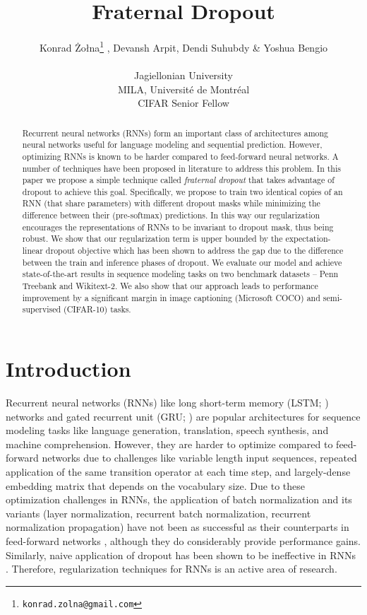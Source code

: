 \documentclass{article} \usepackage{iclr2018_conference,times}
\title{Fraternal Dropout}
\author{
Konrad \.Zo\l{}na\thanks{\texttt{konrad.zolna@gmail.com}}  , Devansh Arpit, Dendi Suhubdy \& Yoshua Bengio
\\\\
Jagiellonian University\\
MILA, Universit\'e de Montr\'eal\\
CIFAR Senior Fellow}
\begin{document}
\maketitle

\begin{abstract}
Recurrent neural networks (RNNs) form an important class of architectures among neural networks useful for language modeling and sequential prediction. However, optimizing RNNs is known to be harder compared to feed-forward neural networks. A number of techniques have been proposed in literature to address this problem. In this paper we propose a simple technique called \emph{fraternal dropout} that takes advantage of dropout to achieve this goal. Specifically, we propose to train two identical copies of an RNN (that share parameters) with different dropout masks while minimizing the difference between their (pre-softmax) predictions. In this way our regularization encourages the representations of RNNs to be invariant to dropout mask, thus being robust. We show that our regularization term is upper bounded by the expectation-linear dropout objective which has been shown to address the gap due to the difference between the train and inference phases of dropout. We evaluate our model and achieve state-of-the-art results in sequence modeling tasks on two benchmark datasets -- Penn Treebank and Wikitext-2. We also show that our approach leads to performance improvement by a significant margin in image captioning (Microsoft COCO) and semi-supervised (CIFAR-10) tasks.
\end{abstract}

\section{Introduction}
Recurrent neural networks (RNNs) like long short-term memory (LSTM; \cite{lstm}) networks and gated recurrent unit (GRU; \cite{gru}) are popular architectures for sequence modeling tasks like language generation, translation, speech synthesis, and machine comprehension. However, they are harder to optimize compared to feed-forward networks due to challenges like variable length input sequences, repeated application of the same transition operator at each time step, and largely-dense embedding matrix that depends on the vocabulary size. Due to these optimization challenges in RNNs, the application of batch normalization and its variants (layer normalization, recurrent batch normalization, recurrent normalization propagation) have not been as successful as their counterparts in feed-forward networks \citep{laurent2016batch}, although they do considerably provide performance gains. Similarly, naive application of dropout \citep{srivastava2014dropout} has been shown to be ineffective in RNNs \citep{zaremba2014recurrent}. Therefore, regularization techniques for RNNs is an active area of research.
\end{document}
